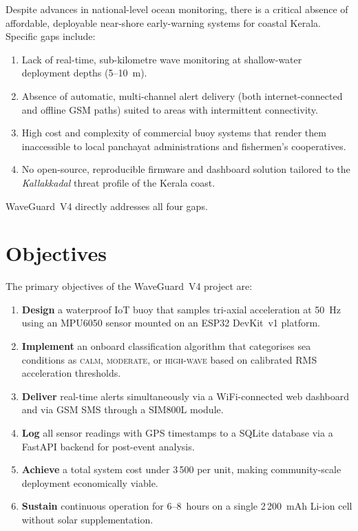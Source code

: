 Despite advances in national-level ocean monitoring, there is a critical absence of
affordable, deployable near-shore early-warning systems for coastal Kerala.
Specific gaps include:

\begin{enumerate}[label=\roman*.]
  \item Lack of real-time, sub-kilometre wave monitoring at shallow-water deployment
        depths (5--10~m).
  \item Absence of automatic, multi-channel alert delivery (both internet-connected
        and offline GSM paths) suited to areas with intermittent connectivity.
  \item High cost and complexity of commercial buoy systems that render them
        inaccessible to local panchayat administrations and fishermen's cooperatives.
  \item No open-source, reproducible firmware and dashboard solution tailored to the
        \textit{Kallakkadal} threat profile of the Kerala coast.
\end{enumerate}

\noindent WaveGuard~V4 directly addresses all four gaps.

\section{Objectives}

The primary objectives of the WaveGuard~V4 project are:

\begin{enumerate}
  \item \textbf{Design} a waterproof IoT buoy that samples tri-axial acceleration at
        50~Hz using an MPU6050 sensor mounted on an ESP32 DevKit~v1 platform.
  \item \textbf{Implement} an onboard classification algorithm that categorises sea
        conditions as \textsc{calm}, \textsc{moderate}, or \textsc{high-wave} based
        on calibrated RMS acceleration thresholds.
  \item \textbf{Deliver} real-time alerts simultaneously via a WiFi-connected web
        dashboard and via GSM SMS through a SIM800L module.
  \item \textbf{Log} all sensor readings with GPS timestamps to a SQLite database via
        a FastAPI backend for post-event analysis.
  \item \textbf{Achieve} a total system cost under \INR{}3\,500 per unit, making
        community-scale deployment economically viable.
  \item \textbf{Sustain} continuous operation for 6--8~hours on a single 2\,200~mAh
        Li-ion cell without solar supplementation.
\end{enumerate}

